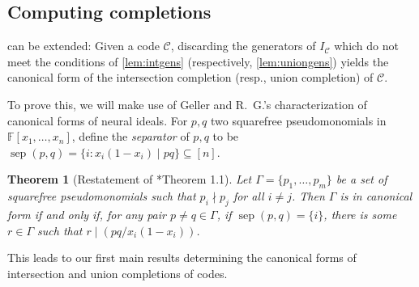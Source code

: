 \documentclass[11pt,letterpaper, reqno]{amsart}
\newtheorem{thm}{Theorem}[section]   %
\theoremstyle{definition}
\DeclareMathOperator{\sep}{sep}
\def\F{\mathbb{F}}
\def\cC{\mathcal{C}}
\begin{document}
\subsection{Computing completions}
     can be extended: Given a code $\cC$, discarding the generators of $I_\cC$ which do not meet the conditions of \cref{lem:intgens} (respectively, \cref{lem:uniongens}) yields the canonical form of the intersection completion (resp., union completion) of $\cC$.

    To prove this, we will make use of Geller and R.~G.'s characterization of canonical forms of neural ideals\cite{Geller2024}.
    For $p,q$ two squarefree pseudomonomials in $\F[x_1,\dots,x_n]$, define the \emph{separator} of $p,q$ to be $\sep(p,q) = \{i : x_i(1-x_i) \mid pq\} \subseteq [n]$.

    \begin{thm}[Restatement of \cite{Geller2024}*{Theorem 1.1}]\label{thm:whencanonical}
		Let $\Gamma = \{p_1,\dots,p_m\}$ be a set of squarefree pseudomonomials such that $p_i \nmid p_j$ for all $i \neq j$. Then $\Gamma$ is in canonical form if and only if, for any pair $p \neq q \in \Gamma$, if $\sep(p,q) = \{i\}$, there is some $r \in \Gamma$ such that $r \mid\left( pq / x_i(1-x_i) \right)$.
	\end{thm}


   This leads to our first main results determining the canonical forms of intersection and union completions of codes.
\end{document}
